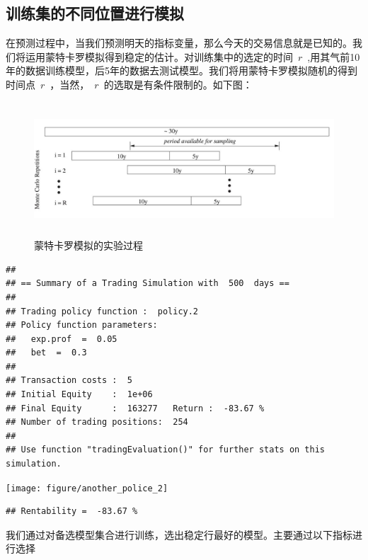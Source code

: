 \documentclass{article}\usepackage[]{graphicx}\usepackage[]{color}
\makeatletter
\newenvironment{kframe}{%
 \def\at@end@of@kframe{}%
 \ifinner\ifhmode%
  \def\at@end@of@kframe{\end{minipage}}%
  \begin{minipage}{\columnwidth}%
 \fi\fi%
 \def\FrameCommand##1{\hskip\@totalleftmargin \hskip-\fboxsep
 \colorbox{shadecolor}{##1}\hskip-\fboxsep
     \hskip-\linewidth \hskip-\@totalleftmargin \hskip\columnwidth}%
 \MakeFramed {\advance\hsize-\width
   \@totalleftmargin\z@ \linewidth\hsize
   \@setminipage}}%
 {\par\unskip\endMakeFramed%
 \at@end@of@kframe}
\newenvironment{knitrout}{}{} %
\makeatother
\begin{document}
\begin{CJK*}{UTF8}{gkai}
\subsection{训练集的不同位置进行模拟}
在预测过程中，当我们预测明天的指标变量，那么今天的交易信息就是已知的。我们将运用蒙特卡罗模拟得到稳定的估计。对训练集中的选定的时间~$r$~,用其气前10年的数据训练模型，后5年的数据去测试模型。我们将用蒙特卡罗模拟随机的得到时间点~$r$~，当然，~$r$~的选取是有条件限制的。如下图：
\begin{figure}[ht]
\centering
\includegraphics[width = 12cm, height = 5cm]{./moto.jpeg}
\caption{蒙特卡罗模拟的实验过程}
\end{figure}
\begin{knitrout}
\color{fgcolor}\begin{kframe}
\begin{verbatim}
## 
## == Summary of a Trading Simulation with  500  days ==
## 
## Trading policy function :  policy.2 
## Policy function parameters:
## 	 exp.prof  =  0.05 
## 	 bet  =  0.3 
## 
## Transaction costs :  5 
## Initial Equity    :  1e+06 
## Final Equity      :  163277   Return :  -83.67 %
## Number of trading positions:  254 
## 
## Use function "tradingEvaluation()" for further stats on this simulation.
\end{verbatim}
\end{kframe}

{\centering \texttt{[image: figure/another\_police\_2]} 

}


\begin{kframe}\begin{verbatim}
## Rentability =  -83.67 %
\end{verbatim}
\end{kframe}
\end{knitrout}





我们通过对备选模型集合进行训练，选出稳定行最好的模型。主要通过以下指标进行选择


\end{CJK*}
\end{document}
